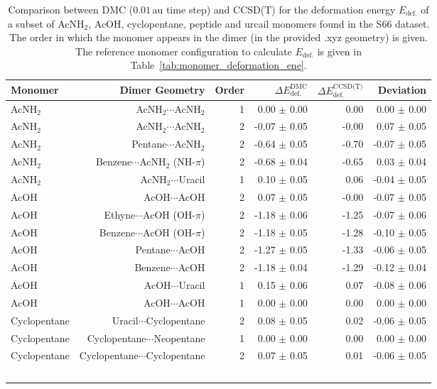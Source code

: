 \begin{table}
\caption{\label{tab:monomer_deformation_ene_validation}Comparison between DMC ($0.01\,$au time step) and CCSD(T) for the deformation energy $E_\text{def.}$ of a subset of AcNH$_2$, AcOH, cyclopentane, peptide and urcail monomers found in the S66 dataset. The order in which the monomer appears in the dimer (in the provided .xyz geometry) is given. The reference monomer configuration to calculate $E_\text{def.}$ is given in Table~\ref{tab:monomer_deformation_ene}.}
\begin{adjustbox}{center}
\begin{tabular}{lrrrrr}
\toprule
Monomer & Dimer Geometry & Order & $\Delta E_\text{def.}^\text{DMC}$ & $\Delta E_\text{def.}^\text{CCSD(T)}$ & Deviation \\ 
\midrule
AcNH$_2$ & AcNH$_2$$\cdots$AcNH$_2$ & 1 & 0.00 $\pm$ 0.00 & 0.00 & 0.00 $\pm$ 0.00 \\
AcNH$_2$ & AcNH$_2$$\cdots$AcNH$_2$ & 2 & -0.07 $\pm$ 0.05 & -0.00 & 0.07 $\pm$ 0.05 \\
AcNH$_2$ & Pentane$\cdots$AcNH$_2$ & 2 & -0.64 $\pm$ 0.05 & -0.70 & -0.07 $\pm$ 0.05 \\
AcNH$_2$ & Benzene$\cdots$AcNH$_2$ (NH-$\pi$) & 2 & -0.68 $\pm$ 0.04 & -0.65 & 0.03 $\pm$ 0.04 \\
AcNH$_2$ & AcNH$_2$$\cdots$Uracil & 1 & 0.10 $\pm$ 0.05 & 0.06 & -0.04 $\pm$ 0.05 \\
AcOH & AcOH$\cdots$AcOH & 2 & 0.07 $\pm$ 0.05 & -0.00 & -0.07 $\pm$ 0.05 \\
AcOH & Ethyne$\cdots$AcOH (OH-$\pi$) & 2 & -1.18 $\pm$ 0.06 & -1.25 & -0.07 $\pm$ 0.06 \\
AcOH & Benzene$\cdots$AcOH (OH-$\pi$) & 2 & -1.18 $\pm$ 0.05 & -1.28 & -0.10 $\pm$ 0.05 \\
AcOH & Pentane$\cdots$AcOH & 2 & -1.27 $\pm$ 0.05 & -1.33 & -0.06 $\pm$ 0.05 \\
AcOH & Benzene$\cdots$AcOH & 2 & -1.18 $\pm$ 0.04 & -1.29 & -0.12 $\pm$ 0.04 \\
AcOH & AcOH$\cdots$Uracil & 1 & 0.15 $\pm$ 0.06 & 0.07 & -0.08 $\pm$ 0.06 \\
AcOH & AcOH$\cdots$AcOH & 1 & 0.00 $\pm$ 0.00 & 0.00 & 0.00 $\pm$ 0.00 \\
Cyclopentane & Uracil$\cdots$Cyclopentane & 2 & 0.08 $\pm$ 0.05 & 0.02 & -0.06 $\pm$ 0.05 \\
Cyclopentane & Cyclopentane$\cdots$Neopentane & 1 & 0.00 $\pm$ 0.00 & 0.00 & 0.00 $\pm$ 0.00 \\
Cyclopentane & Cyclopentane$\cdots$Cyclopentane & 2 & 0.07 $\pm$ 0.05 & 0.01 & -0.06 $\pm$ 0.05 \\
$$
\end{tabular}
\end{adjustbox}
\end{table}
